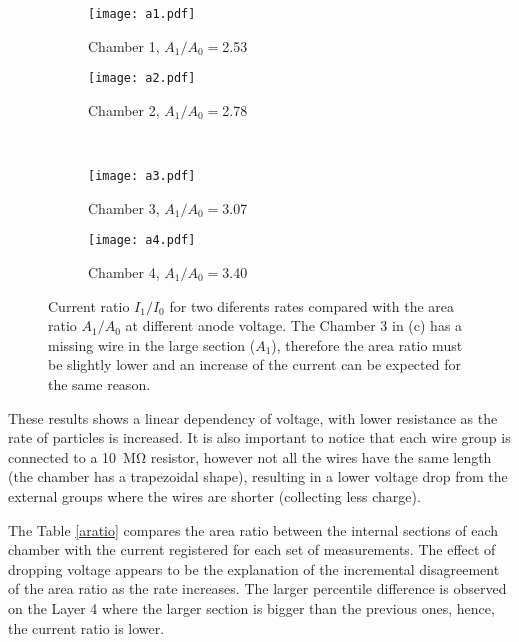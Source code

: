 \begin{figure}[t]
		\hspace*{\fill}
		\begin{subfigure}[b]{0.45\textwidth}
			\centering
			\texttt{[image: a1.pdf]}
			\caption{Chamber 1, $A_1/A_0=$2.53}\label{fig:a1}
		\end{subfigure}
		\hfill
		\begin{subfigure}[b]{0.45\textwidth}
			\centering
			\texttt{[image: a2.pdf]}
			\caption{Chamber 2, $A_1/A_0=$2.78}\label{fig:a2}
		\end{subfigure}
		\hspace*{\fill}\\
		\hspace*{\fill}
		\begin{subfigure}[b]{0.45\textwidth}
			\centering
			\texttt{[image: a3.pdf]}
			\caption{Chamber 3, $A_1/A_0=$3.07}\label{fig:a3}
		\end{subfigure}
		\hfill
		\begin{subfigure}[b]{0.45\textwidth}
			\centering
			\texttt{[image: a4.pdf]}
			\caption{Chamber 4, $A_1/A_0=$3.40}\label{fig:a4}
		\end{subfigure}
		\hspace*{\fill}
		\caption{Current ratio $I_1/I_0$ for two diferents rates compared with the area ratio $A_1/A_0$ at different anode
		voltage. The Chamber 3 in (c) has a missing wire in the large section ($A_1$), therefore the area ratio
		must be slightly lower and an increase of the current can be expected for the same reason.}\label{plotratios}
\end{figure}

These results shows a linear dependency of voltage, with lower resistance as the rate of particles is increased. It is
also important to notice that each wire group is connected to a \SI{10}{\mega\ohm} resistor, however not all the wires
have the same length (the chamber has a trapezoidal shape), resulting in a lower voltage drop from the external groups where the
wires are shorter (collecting less charge).\par

The Table \ref{aratio} compares the area ratio between the internal sections of each chamber with the current registered
for each set of measurements. The effect of dropping voltage appears to be the explanation of the incremental
disagreement of the area ratio as the rate increases. The larger percentile difference is observed on the Layer 4 where the
larger section is bigger than the previous ones, hence, the current ratio is lower.\par


